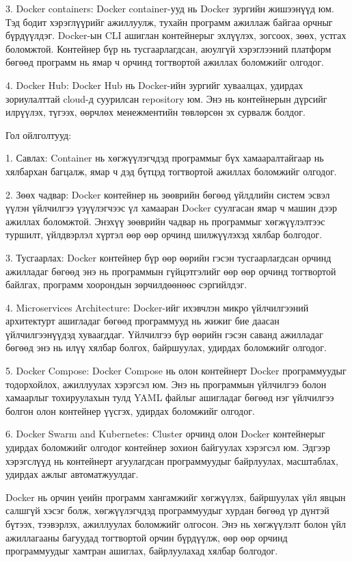 			3. Docker containers: Docker container-ууд нь Docker зургийн жишээнүүд юм. Тэд бодит хэрэглүүрийг ажиллуулж, тухайн программ ажиллаж байгаа орчныг бүрдүүлдэг. Docker-ын CLI ашиглан контейнерыг эхлүүлэх, зогсоох, зөөх, устгах боломжтой. Контейнер бүр нь тусгаарлагдсан, аюулгүй хэрэглээний платформ бөгөөд программ нь ямар ч орчинд тогтвортой ажиллах боломжийг олгодог.
			
			4. Docker Hub: Docker Hub нь Docker-ийн зургийг хуваалцах, удирдах зориулалттай cloud-д суурилсан repository юм. Энэ нь контейнерын дүрсийг илрүүлэх, түгээх, өөрчлөх менежментийн төвлөрсөн эх сурвалж болдог.
			
			Гол ойлголтууд:
			
			1. Савлах: Container нь хөгжүүлэгчдэд программыг бүх хамааралтайгаар нь хялбархан багцалж, ямар ч дэд бүтцэд тогтвортой ажиллах боломжийг олгодог.
			
			2. Зөөх чадвар: Docker контейнер нь зөөврийн бөгөөд үйлдлийн систем эсвэл үүлэн үйлчилгээ үзүүлэгчээс үл хамааран Docker суулгасан ямар ч машин дээр ажиллах боломжтой. Энэхүү зөөврийн чадвар нь программыг хөгжүүлэлтээс туршилт, үйлдвэрлэл хүртэл өөр өөр орчинд шилжүүлэхэд хялбар болгодог.
			
			3. Тусгаарлах: Docker контейнер бүр өөр өөрийн гэсэн тусгаарлагдсан орчинд ажилладаг бөгөөд энэ нь программын гүйцэтгэлийг өөр өөр орчинд тогтвортой байлгах, программ хоорондын зөрчилдөөнөөс сэргийлдэг.
			
			4. Microservices Architecture: Docker-ийг ихэвчлэн микро үйлчилгээний архитектурт ашигладаг бөгөөд программууд нь жижиг бие даасан үйлчилгээнүүдэд хуваагддаг. Үйлчилгээ бүр өөрийн гэсэн саванд ажилладаг бөгөөд энэ нь илүү хялбар болгох, байршуулах, удирдах боломжийг олгодог.
			
			5. Docker Compose: Docker Compose нь олон контейнерт Docker программуудыг тодорхойлох, ажиллуулах хэрэгсэл юм. Энэ нь программын үйлчилгээ болон хамаарлыг тохируулахын тулд YAML файлыг ашигладаг бөгөөд нэг үйлчилгээ болгон олон контейнер үүсгэх, удирдах боломжийг олгодог.
			
			6. Docker Swarm and Kubernetes: Cluster орчинд олон Docker контейнерыг удирдах боломжийг олгодог контейнер зохион байгуулах хэрэгсэл юм. Эдгээр хэрэгслүүд нь контейнерт агуулагдсан программуудыг байрлуулах, масштаблах, удирдах ажлыг автоматжуулдаг.
			
			Docker нь орчин үеийн программ хангамжийг хөгжүүлэх, байршуулах үйл явцын салшгүй хэсэг болж, хөгжүүлэгчдэд программуудыг хурдан бөгөөд үр дүнтэй бүтээх, тээвэрлэх, ажиллуулах боломжийг олгосон. Энэ нь хөгжүүлэлт болон үйл ажиллагааны багуудад тогтвортой орчин бүрдүүлж, өөр өөр орчинд программуудыг хамтран ашиглах, байрлуулахад хялбар болгодог.
	\pagebreak
